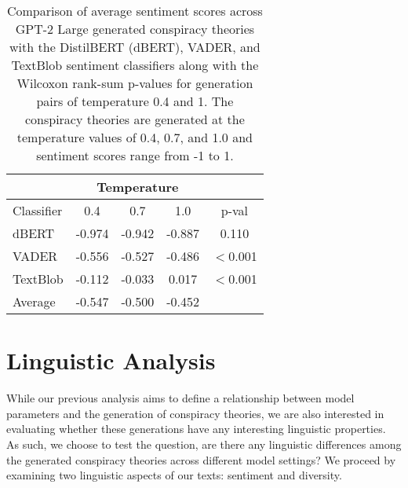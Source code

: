 \documentclass[11pt,a4paper]{article}
\begin{document}
\begin{table}[t]
\centering
\begin{tabular}{l|*{3}{c}|c}
\toprule
&   \multicolumn{3}{c}{Temperature} \\
\hline
Classifier  & 0.4  & 0.7  & {1.0} & p-val   \\
\toprule
dBERT  & -0.974  & -0.942  & -0.887 & 0.110  \\
\hline
VADER  & -0.556  & -0.527  & -0.486 & $<$0.001   \\
\hline
TextBlob  &  -0.112  & -0.033  & 0.017 & $<$0.001  \\
\hline
\hline
Average   & -0.547  & -0.500 & -0.452 \\ 
\bottomrule
 \end{tabular}
\caption{Comparison of average sentiment scores across GPT-2 Large generated conspiracy theories with the DistilBERT (dBERT), VADER, and TextBlob sentiment classifiers along with the Wilcoxon rank-sum p-values for generation pairs of temperature 0.4 and 1. The conspiracy theories are generated at the temperature values of 0.4, 0.7, and 1.0 and sentiment scores range from -1 to 1.
}\label{tab:sentiment}
\end{table}


\section{Linguistic Analysis}
While our previous analysis aims to define a relationship between model parameters and the generation of conspiracy theories, we are also interested in evaluating whether these generations have any interesting linguistic properties. As such, we choose to test the question, are there any linguistic differences among the generated conspiracy theories across different model settings? We proceed by examining two linguistic aspects of our texts: sentiment and diversity. 
\end{document}
